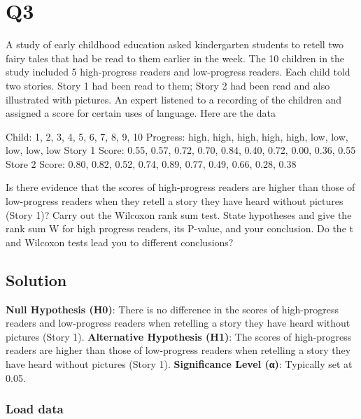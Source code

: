 \documentclass[
]{article}
\begin{document}
\hypertarget{q3}{%
\section{Q3}\label{q3}}

A study of early childhood education asked kindergarten students to
retell two fairy tales that had be read to them earlier in the week. The
10 children in the study included 5 high-progress readers and
low-progress readers. Each child told two stories. Story 1 had been read
to them; Story 2 had been read and also illustrated with pictures. An
expert listened to a recording of the children and assigned a score for
certain uses of language. Here are the data

Child: 1, 2, 3, 4, 5, 6, 7, 8, 9, 10 Progress: high, high, high, high,
high, low, low, low, low, low Story 1 Score: 0.55, 0.57, 0.72, 0.70,
0.84, 0.40, 0.72, 0.00, 0.36, 0.55 Store 2 Score: 0.80, 0.82, 0.52,
0.74, 0.89, 0.77, 0.49, 0.66, 0.28, 0.38

Is there evidence that the scores of high-progress readers are higher
than those of low-progress readers when they retell a story they have
heard without pictures (Story 1)? Carry out the Wilcoxon rank sum test.
State hypotheses and give the rank sum W for high progress readers, its
P-value, and your conclusion. Do the t and Wilcoxon tests lead you to
different conclusions?

\hypertarget{solution-2}{%
\subsection{Solution}\label{solution-2}}

\textbf{Null Hypothesis (H0)}: There is no difference in the scores of
high-progress readers and low-progress readers when retelling a story
they have heard without pictures (Story 1). \textbf{Alternative
Hypothesis (H1)}: The scores of high-progress readers are higher than
those of low-progress readers when retelling a story they have heard
without pictures (Story 1). \textbf{Significance Level (α)}: Typically
set at 0.05.

\hypertarget{load-data-2}{%
\subsubsection{Load data}\label{load-data-2}}
\end{document}

